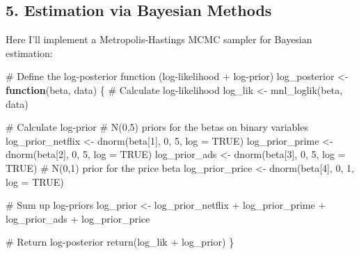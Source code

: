 \documentclass[
  letterpaper,
  DIV=11,
  numbers=noendperiod]{scrartcl}
\newenvironment{Shaded}{\begin{snugshade}}{\end{snugshade}}
\newcommand{\AttributeTok}[1]{\textcolor[rgb]{0.40,0.45,0.13}{#1}}
\newcommand{\CommentTok}[1]{\textcolor[rgb]{0.37,0.37,0.37}{#1}}
\newcommand{\ConstantTok}[1]{\textcolor[rgb]{0.56,0.35,0.01}{#1}}
\newcommand{\ControlFlowTok}[1]{\textcolor[rgb]{0.00,0.23,0.31}{\textbf{#1}}}
\newcommand{\DecValTok}[1]{\textcolor[rgb]{0.68,0.00,0.00}{#1}}
\newcommand{\FunctionTok}[1]{\textcolor[rgb]{0.28,0.35,0.67}{#1}}
\newcommand{\NormalTok}[1]{\textcolor[rgb]{0.00,0.23,0.31}{#1}}
\newcommand{\OtherTok}[1]{\textcolor[rgb]{0.00,0.23,0.31}{#1}}
\newcommand{\SpecialCharTok}[1]{\textcolor[rgb]{0.37,0.37,0.37}{#1}}
\begin{document}
\subsection{5. Estimation via Bayesian
Methods}\label{estimation-via-bayesian-methods}

Here I'll implement a Metropolis-Hastings MCMC sampler for Bayesian
estimation:

\begin{Shaded}
\begin{Highlighting}[]
\CommentTok{\# Define the log{-}posterior function (log{-}likelihood + log{-}prior)}
\NormalTok{log\_posterior }\OtherTok{\textless{}{-}} \ControlFlowTok{function}\NormalTok{(beta, data) \{}
  \CommentTok{\# Calculate log{-}likelihood}
\NormalTok{  log\_lik }\OtherTok{\textless{}{-}} \FunctionTok{mnl\_loglik}\NormalTok{(beta, data)}
  
  \CommentTok{\# Calculate log{-}prior}
  \CommentTok{\# N(0,5) priors for the betas on binary variables}
\NormalTok{  log\_prior\_netflix }\OtherTok{\textless{}{-}} \FunctionTok{dnorm}\NormalTok{(beta[}\DecValTok{1}\NormalTok{], }\DecValTok{0}\NormalTok{, }\DecValTok{5}\NormalTok{, }\AttributeTok{log =} \ConstantTok{TRUE}\NormalTok{)}
\NormalTok{  log\_prior\_prime }\OtherTok{\textless{}{-}} \FunctionTok{dnorm}\NormalTok{(beta[}\DecValTok{2}\NormalTok{], }\DecValTok{0}\NormalTok{, }\DecValTok{5}\NormalTok{, }\AttributeTok{log =} \ConstantTok{TRUE}\NormalTok{)}
\NormalTok{  log\_prior\_ads }\OtherTok{\textless{}{-}} \FunctionTok{dnorm}\NormalTok{(beta[}\DecValTok{3}\NormalTok{], }\DecValTok{0}\NormalTok{, }\DecValTok{5}\NormalTok{, }\AttributeTok{log =} \ConstantTok{TRUE}\NormalTok{)}
  \CommentTok{\# N(0,1) prior for the price beta}
\NormalTok{  log\_prior\_price }\OtherTok{\textless{}{-}} \FunctionTok{dnorm}\NormalTok{(beta[}\DecValTok{4}\NormalTok{], }\DecValTok{0}\NormalTok{, }\DecValTok{1}\NormalTok{, }\AttributeTok{log =} \ConstantTok{TRUE}\NormalTok{)}
  
  \CommentTok{\# Sum up log{-}priors}
\NormalTok{  log\_prior }\OtherTok{\textless{}{-}}\NormalTok{ log\_prior\_netflix }\SpecialCharTok{+}\NormalTok{ log\_prior\_prime }\SpecialCharTok{+}\NormalTok{ log\_prior\_ads }\SpecialCharTok{+}\NormalTok{ log\_prior\_price}
  
  \CommentTok{\# Return log{-}posterior}
  \FunctionTok{return}\NormalTok{(log\_lik }\SpecialCharTok{+}\NormalTok{ log\_prior)}
\NormalTok{\}}
\end{Highlighting}
\end{Shaded}
\end{document}

